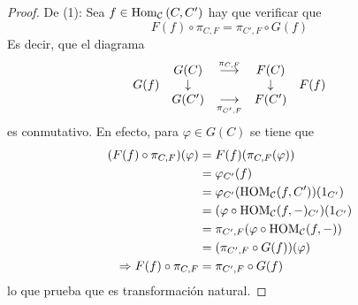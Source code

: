 \documentclass[12pt]{report}
\newcounter{it}
\theoremstyle{largebreak}
\newcommand{\Hom}[3]{\ensuremath{\textup{Hom}_{#1}\left(#2,#3\right)}}
\begin{document}
    \begin{proof}
        De (1): Sea $f\in\Hom{\mathcal{C}}{C}{C'}$ hay que verificar que
        \begin{equation*}
            F(f)\circ\pi_{ C,F}=\pi_{ C',F}\circ G(f)
        \end{equation*}
        Es decir, que el diagrama
        \begin{equation*}
            \begin{array}[pos]{rcccl}
                & G(C) & \overset{\pi_{ C,F}}{\longrightarrow} & F(C) & \\
                G(f) & \downarrow & & \downarrow & F(f) \\
               & G(C') & \underset{\pi_{ C',F}}{\longrightarrow} & F(C') & \\
            \end{array}
        \end{equation*}
        es conmutativo. En efecto, para $\varphi\in G(C)$ se tiene que
        \begin{equation*}
            \begin{split}
                (F(f)\circ\pi_{C,F})(\varphi)&=F(f)(\pi_{ C,F}(\varphi))\\
                &=\varphi_{ C'}(f)\\
                &=\varphi_{C'}(\textup{HOM}_{\mathcal{C}}(f,C'))(1_{C'})\\
                &=(\varphi\circ\textup{HOM}_{\mathcal{C}}(f,-)_{C'})(1_{C'})\\
                &=\pi_{ C',F}(\varphi\circ\textup{HOM}_{\mathcal{C}}(f,-))\\
                &=(\pi_{ C',F}\circ G(f))(\varphi)\\
                \Rightarrow F(f)\circ\pi_{C,F}&=\pi_{ C',F}\circ G(f)\\
            \end{split}
        \end{equation*}
        lo que prueba que es transformación natural.


\end{proof}
\end{document}
